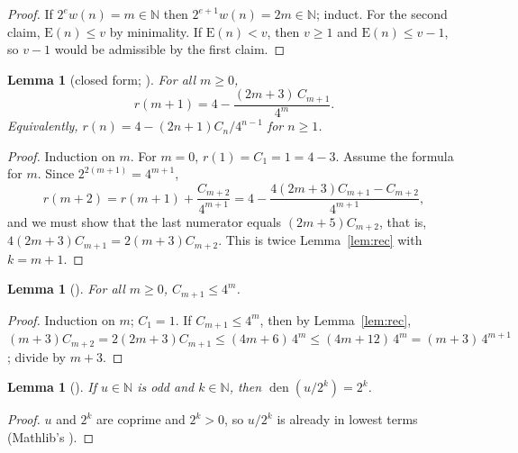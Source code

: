 \documentclass[11pt]{amsart}
\theoremstyle{plain}
\newtheorem{lemma}[theorem]{Lemma}
\theoremstyle{definition}
\newcommand{\N}{\mathbb{N}}
\DeclareMathOperator{\den}{den}
\newcommand{\E}{\mathrm{E}}
\begin{document}
\begin{proof}
If $2^{e}w(n)=m\in\N$ then $2^{e+1}w(n)=2m\in\N$; induct. For the second claim, $\E(n)\le v$ by minimality. If $\E(n)<v$, then $v\ge1$ and $\E(n)\le v-1$, so $v-1$ would be admissible by the first claim.
\end{proof}

\begin{lemma}[closed form; ]\label{lem:closed}
For all $m\ge0$,
\[
  r(m+1)=4-\frac{(2m+3)\,C_{m+1}}{4^{m}} .
\]
Equivalently, $r(n)=4-(2n+1)C_n/4^{n-1}$ for $n\ge1$.
\end{lemma}

\begin{proof}
Induction on $m$. For $m=0$, $r(1)=C_1=1=4-3$. Assume the formula for $m$. Since $2^{2(m+1)}=4^{m+1}$,
\[
  r(m+2)=r(m+1)+\frac{C_{m+2}}{4^{m+1}}=4-\frac{4(2m+3)C_{m+1}-C_{m+2}}{4^{m+1}},
\]
and we must show that the last numerator equals $(2m+5)C_{m+2}$, that is, $4(2m+3)C_{m+1}=2(m+3)C_{m+2}$. This is twice Lemma~\ref{lem:rec} with $k=m+1$.
\end{proof}

\begin{lemma}[]\label{lem:bound}
For all $m\ge0$, $C_{m+1}\le 4^{m}$.
\end{lemma}

\begin{proof}
Induction on $m$; $C_1=1$. If $C_{m+1}\le4^m$, then by Lemma~\ref{lem:rec},
$(m+3)C_{m+2}=2(2m+3)C_{m+1}\le(4m+6)\,4^m\le(4m+12)\,4^m=(m+3)\,4^{m+1}$; divide by $m+3$.
\end{proof}

\begin{lemma}[]\label{lem:den}
If $u\in\N$ is odd and $k\in\N$, then $\den(u/2^{k})=2^{k}$.
\end{lemma}

\begin{proof}
$u$ and $2^k$ are coprime and $2^k>0$, so $u/2^k$ is already in lowest terms (Mathlib's ).
\end{proof}
\end{document}
